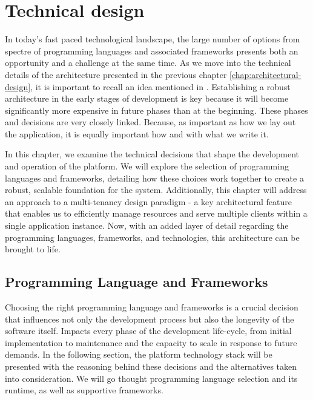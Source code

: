 \chapter{Technical design}
\label{chap:technical-design}
In today's fast paced technological landscape, the large number of options from spectre of programming languages and associated frameworks presents both an opportunity and a challenge at the same time.
As we move into the technical details of the architecture presented in the previous chapter \ref{chap:architectural-design}, it is important to recall an idea mentioned in \cite{sommervilleSW}. Establishing a robust architecture in the early stages of development is key because it will become significantly more expensive in future phases than at the beginning. 
These phases and decisions are very closely linked. 
Because, as important as how we lay out the application, it is equally important how and with what we write it.

In this chapter, we examine the technical decisions that shape the development and operation of the platform.
We will explore the selection of programming languages and frameworks, detailing how these choices work together to create a robust, scalable foundation for the system.
Additionally, this chapter will address an approach to a multi-tenancy design paradigm - a key architectural feature that enables us to efficiently manage resources and serve multiple clients within a single application instance.
Now, with an added layer of detail regarding the programming languages, frameworks, and technologies, this architecture can be brought to life. 

\section{Programming Language and Frameworks}
\label{sec:programming-language-frameworks}
Choosing the right programming language and frameworks is a crucial decision that influences not only the development process but also the longevity of the software itself.
Impacts every phase of the development life-cycle, from initial implementation to maintenance and the capacity to scale in response to future demands.
In the following section, the platform technology stack will be presented with the reasoning behind these decisions and the alternatives taken into consideration. 
We will go thought programming language selection and its runtime, as well as supportive frameworks.

